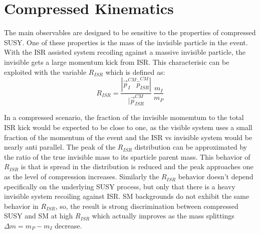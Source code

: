 
\section{Compressed Kinematics}

The main observables are designed to be sensitive to the properties of compressed SUSY. One of these properties is the mass of the invisible particle in the event. With the ISR assisted system recoiling against a massive invisible particle, the invisible gets a large momentum kick from ISR.  This characterisic can be exploited with the variable $R_{ISR}$ which is defined as:
\begin{equation}
R_{ISR} = \frac{|\vec{p}_I^{CM} \dot \hat{p}_{ISR}^{CM}|}{|\vec{p}_{ISR}^{CM}} ~ \frac{m_I}{m_P}
\end{equation}

In a compressed scenario, the fraction of the invisible momemtum to the total ISR kick would be expected to be close to one, as the visible system uses a small fraction of the momentum of the event and the ISR vs invisible system would be nearly anti parallel. The peak of the $R_{ISR}$ distribution can be approximated by the ratio of the true invisible mass to its sparticle parent mass.  This behavior of $R_{ISR}$ is that is spread in the distribution is reduced and the peak approaches one as the level of compression increases. Similarly the $R_{ISR}$ behavior doesn't depend specifically on the underlying SUSY process, but only that there is a heavy invisible system recoiling against ISR.  SM backgrounds do not exhibit the same behavior in $R_{ISR}$, so, the result is strong discrimination between compressed SUSY and SM at high $R_{ISR}$ which actually improves as the mass splittings $\Delta m = m_P - m_I$ decrease.

